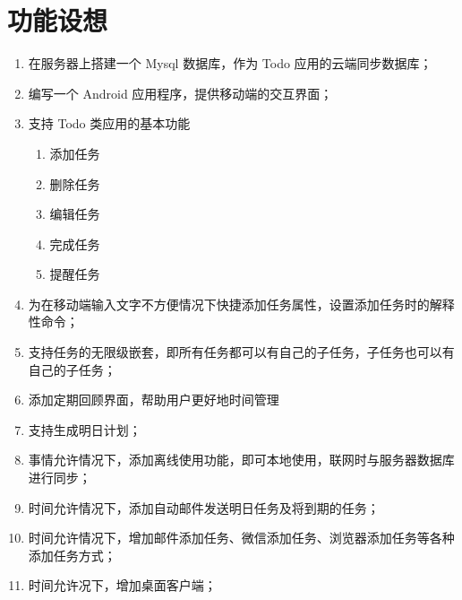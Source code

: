 \section{功能设想}
\begin{enumerate}
    \item 在服务器上搭建一个 Mysql 数据库，作为 Todo 应用的云端同步数据库；
    \item 编写一个 Android 应用程序，提供移动端的交互界面；
    \item 支持 Todo 类应用的基本功能
        \begin{enumerate}
            \item 添加任务
            \item 删除任务
            \item 编辑任务
            \item 完成任务
            \item 提醒任务
        \end{enumerate}
    \item 为在移动端输入文字不方便情况下快捷添加任务属性，设置添加任务时的解释性命令；
    \item 支持任务的无限级嵌套，即所有任务都可以有自己的子任务，子任务也可以有自己的子任务；
    \item 添加定期回顾界面，帮助用户更好地时间管理
    \item 支持生成明日计划；
    \item 事情允许情况下，添加离线使用功能，即可本地使用，联网时与服务器数据库进行同步；
    \item 时间允许情况下，添加自动邮件发送明日任务及将到期的任务；
    \item 时间允许情况下，增加邮件添加任务、微信添加任务、浏览器添加任务等各种添加任务方式；
    \item 时间允许况下，增加桌面客户端；
\end{enumerate}

